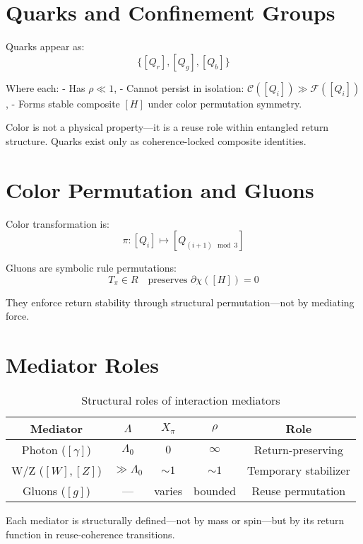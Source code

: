 \section{Quarks and Confinement Groups} \label{sec:quarks}

Quarks appear as:
\[
\{[Q_r], [Q_g], [Q_b]\}
\]

Where each:
- Has $\rho \ll 1$,
- Cannot persist in isolation: $\mathcal{C}([Q_i]) \gg \mathcal{F}([Q_i])$,
- Forms stable composite $[H]$ under color permutation symmetry.

Color is not a physical property—it is a reuse role within entangled return structure. Quarks exist only as coherence-locked composite identities.

\section{Color Permutation and Gluons} \label{sec:gluons-in-sm}

Color transformation is:
\[
\pi: [Q_i] \mapsto [Q_{(i+1)\mod 3}]
\]

Gluons are symbolic rule permutations:
\[
T_\pi \in R \quad \text{preserves } \partial\chi([H]) = 0
\]

They enforce return stability through structural permutation—not by mediating force.

\section{Mediator Roles} \label{sec:mediators}

\begin{table}[h!]
\centering
\begin{tabular}{|c|c|c|c|c|}
\hline
\textbf{Mediator} & $\Lambda$ & $X_\pi$ & $\rho$ & Role \\
\hline
Photon ($[\gamma]$) & $\Lambda_0$ & $0$ & $\infty$ & Return-preserving \\
W/Z ($[W],[Z]$)     & $\gg \Lambda_0$ & $\sim 1$ & $\sim 1$ & Temporary stabilizer \\
Gluons ($[g]$)      & — & varies & bounded & Reuse permutation \\
\hline
\end{tabular}
\caption{Structural roles of interaction mediators}
\end{table}

Each mediator is structurally defined—not by mass or spin—but by its return function in reuse-coherence transitions.

